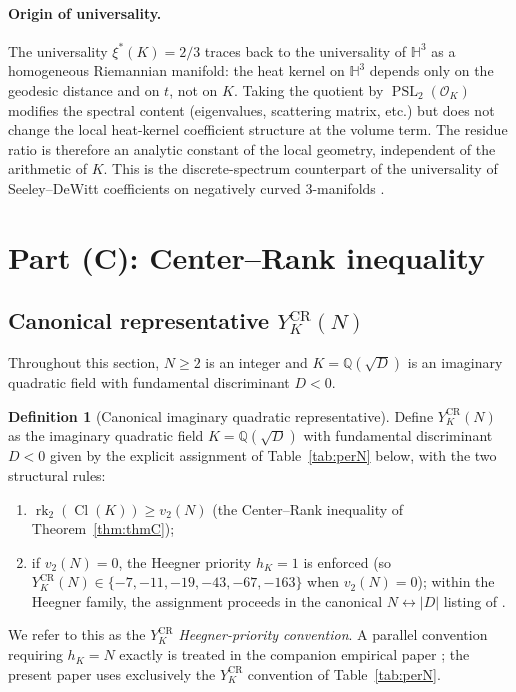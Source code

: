 \documentclass[11pt,a4paper,reqno]{amsart}
\theoremstyle{definition}
\newtheorem{definition}[theorem]{Definition}
\DeclareMathOperator{\PSL}{PSL}
\DeclareMathOperator{\Cl}{Cl}
\DeclareMathOperator{\rk}{rk}
\newcommand{\OK}{\mathcal{O}_K}
\newcommand{\HH}{\mathbb{H}}
\newcommand{\QQ}{\mathbb{Q}}
\newcommand{\xis}{\xi^{*}}
\newcommand{\vtwo}{v_2}
\newcommand{\YKCR}{Y_K^{\mathrm{CR}}}
\begin{document}
\paragraph{Origin of universality.}
The universality $\xis(K)=2/3$ traces back to the universality of $\HH^3$ as a
homogeneous Riemannian manifold: the heat kernel on $\HH^3$ depends only on
the geodesic distance and on $t$, not on $K$.  Taking the quotient by
$\PSL_2(\OK)$ modifies the spectral content (eigenvalues, scattering matrix,
etc.) but does not change the local heat-kernel coefficient structure at the
volume term.  The residue ratio is therefore an analytic constant of the
local geometry, independent of the arithmetic of $K$.  This is the
discrete-spectrum counterpart of the universality of Seeley--DeWitt
coefficients on negatively curved 3-manifolds \cite[\S2]{Vassilevich2003}.

\section{Part (C): Center--Rank inequality}\label{sec:thm-C}

\subsection{Canonical representative $\YKCR(N)$}\label{ss:CRsetup}

Throughout this section, $N\ge 2$ is an integer and $K=\QQ(\sqrt{D})$ is an
imaginary quadratic field with fundamental discriminant $D<0$.

\begin{definition}[Canonical imaginary quadratic representative]\label{def:YKCR}
Define $\YKCR(N)$ as the imaginary quadratic field $K=\QQ(\sqrt{D})$ with
fundamental discriminant $D<0$ given by the explicit assignment of
Table~\ref{tab:perN} below, with the two structural rules:
\begin{enumerate}[label=\textup{(\roman*)},leftmargin=2em]
  \item $\rk_2(\Cl(K))\ge\vtwo(N)$ (the Center--Rank inequality of
        Theorem~\ref{thm:thmC});
  \item if $\vtwo(N)=0$, the Heegner priority $h_K=1$ is enforced (so
        $\YKCR(N)\in\{-7,-11,-19,-43,-67,-163\}$ when $\vtwo(N)=0$); within
        the Heegner family, the assignment proceeds in the canonical $N\leftrightarrow|D|$
        listing of \cite[Tab.~1]{Remondiere2026Survey}.
\end{enumerate}
We refer to this as the \emph{$\YKCR$ Heegner-priority convention}.  A
parallel convention requiring $h_K=N$ exactly is treated in the companion
empirical paper \cite{Remondiere2026Transport}; the present paper uses
exclusively the $\YKCR$ convention of Table~\ref{tab:perN}.
\end{definition}
\end{document}
